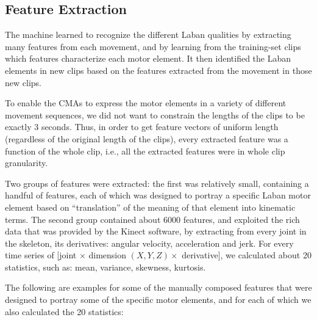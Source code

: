 \subsection{Feature Extraction}
The machine learned to recognize the different Laban qualities by extracting
many features from each movement, and by learning from the training-set clips
which features characterize each motor element. It then identified the Laban
elements in new clips based on the features extracted from the movement in those
new clips.
\par To enable the CMAs to express the motor elements in a variety of different
movement sequences, we did not want to constrain the lengths of the clips to be
exactly 3 seconds. Thus, in order to get feature vectors of uniform length
(regardless of the original length of the clips), every extracted feature was a
function of the whole clip, i.e., all the extracted features were in whole clip
granularity.
\par Two groups of features were extracted: the first was relatively small,
containing a handful of features, each of which was designed to portray a
specific Laban motor element based on “translation” of the meaning of that
element into kinematic terms. The second group contained about 6000 features,
and exploited the rich data that was provided by the Kinect software, by
extracting from every joint in the skeleton, its derivatives: angular velocity,
acceleration and jerk. For every time series of [joint $\times$ dimension $(X,
Y, Z) \times$ derivative], we calculated about 20 statistics, such as: mean, variance,
skewness, kurtosis.
\par The following are examples for some of the manually composed features that
were designed to portray some of the specific motor elements, and for each of which
we also calculated the 20 statistics:
